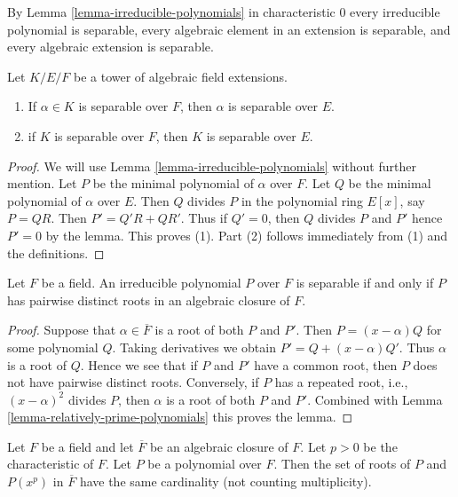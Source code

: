 \noindent
By Lemma \ref{lemma-irreducible-polynomials} in characteristic $0$ every
irreducible polynomial is separable, every algebraic element in an extension
is separable, and every algebraic extension is separable.

\begin{lemma}
\label{lemma-separable-goes-up}
Let $K/E/F$ be a tower of algebraic field extensions.
\begin{enumerate}
\item If $\alpha \in K$ is separable over $F$, then $\alpha$ is separable
over $E$.
\item if $K$ is separable over $F$, then $K$ is separable over $E$.
\end{enumerate}
\end{lemma}

\begin{proof}
We will use Lemma \ref{lemma-irreducible-polynomials} without further mention.
Let $P$ be the minimal polynomial of $\alpha$ over $F$.
Let $Q$ be the minimal polynomial of $\alpha$ over $E$.
Then $Q$ divides $P$ in the polynomial ring $E[x]$, say $P = QR$.
Then $P' = Q'R + QR'$. Thus if $Q' = 0$, then $Q$ divides $P$ and $P'$
hence $P' = 0$ by the lemma. This proves (1). Part (2)
follows immediately from (1) and the definitions.
\end{proof}

\begin{lemma}
\label{lemma-recognize-separable}
Let $F$ be a field. An irreducible polynomial $P$ over $F$
is separable if and only if $P$ has pairwise distinct roots in an
algebraic closure of $F$.
\end{lemma}

\begin{proof}
Suppose that $\alpha \in \overline{F}$ is a root of both $P$ and $P'$.
Then $P = (x - \alpha)Q$ for some polynomial $Q$. Taking derivatives
we obtain $P' = Q + (x - \alpha)Q'$. Thus $\alpha$ is a root of $Q$.
Hence we see that if $P$ and $P'$ have a common root, then $P$
does not have pairwise distinct roots. Conversely, if $P$ has
a repeated root, i.e., $(x - \alpha)^2$ divides $P$, then $\alpha$
is a root of both $P$ and $P'$. Combined with
Lemma \ref{lemma-relatively-prime-polynomials} this proves the lemma.
\end{proof}

\begin{lemma}
\label{lemma-nr-roots-unchanged}
Let $F$ be a field and let $\overline{F}$ be an algebraic closure of $F$.
Let $p > 0$ be the characteristic of $F$. Let $P$ be a polynomial
over $F$. Then the set of roots of $P$ and $P(x^p)$ in $\overline{F}$
have the same cardinality (not counting multiplicity).
\end{lemma}

